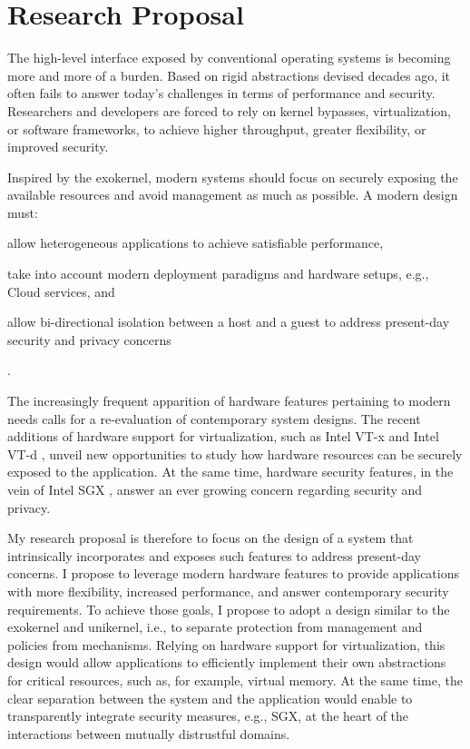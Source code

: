 \section{Research Proposal}

The high-level interface exposed by conventional operating systems is becoming more and more of a burden.
Based on rigid abstractions devised decades ago, it often fails to answer today's challenges in terms of performance and security.
Researchers and developers are forced to rely on kernel bypasses, virtualization, or software frameworks, to achieve higher throughput, greater flexibility, or improved security.

Inspired by the exokernel, modern systems should focus on securely exposing the available resources and avoid management as much as possible.
A modern design must:
\begin{enumerate*}
	\item allow heterogeneous applications to achieve satisfiable performance,
	\item take into account modern deployment paradigms and hardware setups, e.g., Cloud services, and 
	\item allow bi-directional isolation between a host and a guest to address present-day security and privacy concerns
\end{enumerate*}.

The increasingly frequent apparition of hardware features pertaining to modern needs \cite{HardIsSoft} calls for a re-evaluation of contemporary system designs.
The recent additions of hardware support for virtualization, such as Intel VT-x \cite{DBLP:journals/computer/UhligNRSMABKLS05} and Intel VT-d \cite{intelVTD}, unveil new opportunities to study how hardware resources can be securely exposed to the application.
At the same time, hardware security features, in the vein of Intel SGX \cite{SGXManual}, answer an ever growing concern regarding security and privacy.

My research proposal is therefore to focus on the design of a system that intrinsically incorporates and exposes such features to address present-day concerns.
I propose to leverage modern hardware features to provide applications with more flexibility, increased performance, and answer contemporary security requirements.
To achieve those goals, I propose to adopt a design similar to the exokernel and unikernel, i.e., to separate protection from management and policies from mechanisms.
Relying on hardware support for virtualization, this design would allow applications to efficiently implement their own abstractions for critical resources, such as, for example, virtual memory.
At the same time, the clear separation between the system and the application would enable to transparently integrate security measures, e.g., SGX, at the heart of the interactions between mutually distrustful domains.

